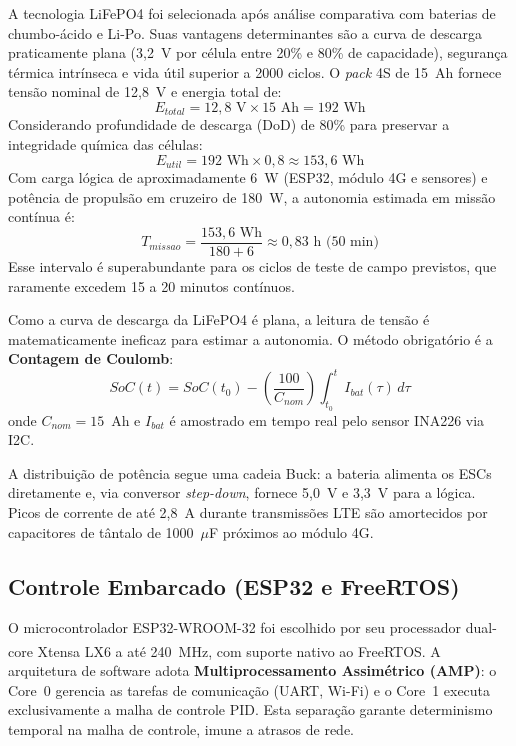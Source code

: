 \documentclass[12pt,a4paper]{article}
\begin{document}
A tecnologia LiFePO4 foi selecionada após análise comparativa com baterias de chumbo-ácido e Li-Po. Suas vantagens determinantes são a curva de descarga praticamente plana (3{,}2~V por célula entre 20\% e 80\% de capacidade), segurança térmica intrínseca e vida útil superior a 2000 ciclos. O \textit{pack} 4S de 15~Ah fornece tensão nominal de 12{,}8~V e energia total de:
\begin{equation}
E_{total} = 12{,}8\text{ V} \times 15\text{ Ah} = 192\text{ Wh}
\end{equation}
Considerando profundidade de descarga (DoD) de 80\% para preservar a integridade química das células:
\begin{equation}
E_{util} = 192\text{ Wh} \times 0{,}8 \approx 153{,}6\text{ Wh}
\end{equation}
Com carga lógica de aproximadamente 6~W (ESP32, módulo 4G e sensores) e potência de propulsão em cruzeiro de 180~W, a autonomia estimada em missão contínua é:
\begin{equation}
T_{missao} = \frac{153{,}6\text{ Wh}}{180 + 6} \approx 0{,}83\text{ h (50 min)}
\end{equation}
Esse intervalo é superabundante para os ciclos de teste de campo previstos, que raramente excedem 15 a 20 minutos contínuos.

Como a curva de descarga da LiFePO4 é plana, a leitura de tensão é matematicamente ineficaz para estimar a autonomia. O método obrigatório é a \textbf{Contagem de Coulomb}:
\begin{equation}
SoC(t) = SoC(t_0) - \left(\frac{100}{C_{nom}}\right) \int_{t_0}^{t} I_{bat}(\tau)\, d\tau
\end{equation}
onde $C_{nom} = 15$~Ah e $I_{bat}$ é amostrado em tempo real pelo sensor INA226 via I2C.

A distribuição de potência segue uma cadeia Buck: a bateria alimenta os ESCs diretamente e, via conversor \textit{step-down}, fornece 5{,}0~V e 3{,}3~V para a lógica. Picos de corrente de até 2{,}8~A durante transmissões LTE são amortecidos por capacitores de tântalo de 1000~$\mu$F próximos ao módulo 4G.

\subsection{Controle Embarcado (ESP32 e FreeRTOS)}

O microcontrolador ESP32-WROOM-32 foi escolhido por seu processador dual-core Xtensa\textsuperscript{\textregistered} LX6 a até 240~MHz, com suporte nativo ao FreeRTOS. A arquitetura de software adota \textbf{Multiprocessamento Assimétrico (AMP)}: o Core~0 gerencia as tarefas de comunicação (UART, Wi-Fi) e o Core~1 executa exclusivamente a malha de controle PID. Esta separação garante determinismo temporal na malha de controle, imune a atrasos de rede.
\end{document}
